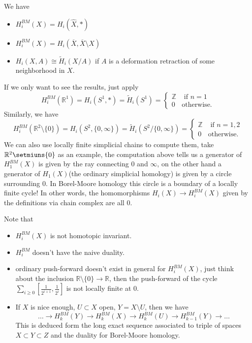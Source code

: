 \documentclass[../main.tex]{subfiles}
\begin{document}
\begin{example}
We have
\begin{itemize}
\item $H_{i}^{BM}(X)=H_{i}(\hat{X}, *)$
\item $H_{i}^{BM}(X)=H_{i}(\overline{X}, \overline{X}\setminus X)$
\item $H_{i}(X, A)\cong \widetilde{H}_{i}(X/A)$ if $A$ is a deformation retraction of some neighborhood in $X$.
\end{itemize}
\end{example}

\begin{example}
If we only want to see the results, just apply $$H_{i}^{BM}(\mathbb{R}^{1})=H_{i}(S^{1}, *)=\widetilde{H}_{i}(S^{1})=\begin{cases}\mathbb{Z} & \text{ if $n=1$}\\
0 & \text{otherwise}.\end{cases}$$
Similarly, we have
$$H_{i}^{BM}(\mathbb{R}^{2}\setminus\{0\})=H_{i}(S^{2}, \{0, \infty\})=\widetilde{H}_{i}(S^{2}/\{0, \infty\})=\begin{cases}\mathbb{Z} & \text{ if $n=1, 2$}\\
0 & \text{otherwise}.\end{cases}$$
We can also use locally finite simplicial chains to compute them, take $\mathbb{R}^{2}\setmiuns\{0\}$ as an example, the computation above tells us a generator of $H_{1}^{BM}(X)$ is given by the ray connecting $0$ and $\infty$, on the other hand a generator of $H_{1}(X)$(the ordinary simplicial homology) is given by a circle surrounding $0$. In Borel-Moore homology this circle is a boundary of a locally finite cycle! In other words, the homomorphisms $H_{i}(X)\rightarrow H_{i}^{BM}(X)$ given by the definitions via chain complex are all $0$.

\end{example}
\begin{remark}
Note that 
\begin{itemize}
\item $H_{i}^{BM}(X)$ is not homotopic invariant.
\item $H_{i}^{BM}$ doesn't have the naive \Poincare duality.
\item ordinary push-forward doesn't exist in general for $H_{i}^{BM}(X)$, just think about the inclusion $\mathbb{R}\setminus\{0\}\rightarrow \mathbb{R}$, then the push-forward of the cycle $\sum_{i\geq 0}[\frac{1}{2^{i+1}}, \frac{1}{2^{i}}]$ is not locally finite at $0$.
\item If $X$ is nice enough, $U\subset X$ open, $Y=X\setminus U$, then we have 
$$\dots \rightarrow H_{k}^{BM}(Y)\rightarrow H_{k}^{BM}(X)\rightarrow H_{k}^{BM}(U)\rightarrow H_{k-1}^{BM}(Y)\rightarrow \dots$$
This is deduced form the long exact sequence associated to triple of spaces $X\subset Y\subset Z$ and the \Poincare duality for Borel-Moore homology.
\end{itemize}
\end{remark}
\end{document}
